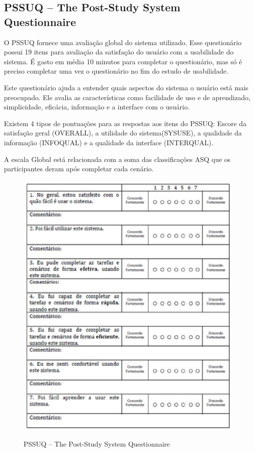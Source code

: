 \subsection{PSSUQ – The Post-Study System Questionnaire}

	O PSSUQ fornece uma avaliação global do sistema utilizado. Esse questionário possui 19 itens para avaliação da satisfação do usuário com a usabilidade do sistema. É gasto em média 10 minutos para completar o questionário, mas só é preciso completar uma vez o questionário no fim do estudo de usabilidade. ~\cite{lewis1995ibm} 

	Este questionário ajuda a entender quais aspectos do sistema o usuário está mais preocupado. Ele avalia as características como facilidade de uso e de aprendizado, simplicidade, eficácia, informação e a interface com o usuário.

	Existem 4 tipos de pontuações para as respostas aos itens do PSSUQ: Escore da satisfação geral (OVERALL), a utilidade do sistema(SYSUSE), a qualidade da  informação (INFOQUAL) e a qualidade da interface (INTERQUAL). 

A escala Global está relacionada com a soma das classificações ASQ que os participantes deram após completar cada cenário. 


\begin{figure}[!h]
    \centering
    \includegraphics[keepaspectratio=true,scale=0.60]
      {figuras/pssuq01.eps}
    \label{pssuq}
	\caption{PSSUQ – The Post-Study System Questionnaire}
\end{figure}

